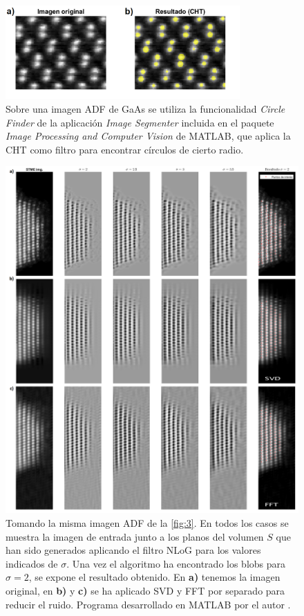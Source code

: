 \begin{figure}[h!]
    \centering
    \includegraphics[width=0.8\textwidth]{fig/Fig6.png}
    \caption{Sobre una imagen ADF de GaAs \cite{maria} se utiliza la funcionalidad \textit{Circle Finder} de la aplicación \textit{Image Segmenter} incluida en el paquete \textit{Image Processing and Computer Vision} de MATLAB, que aplica la CHT \cite{matlab_circulos} como filtro para encontrar círculos de cierto radio.}
    \label{fig:6}
\end{figure}

\newpage
\begin{figure}[h!]
    \centering
    \includegraphics[width=1\textwidth]{fig/Fig7.png}
    \caption{Tomando la misma imagen ADF de la \autoref{fig:3}. En todos los casos se muestra la imagen de entrada junto a los planos del volumen $S$ que han sido generados aplicando el filtro NLoG para los valores indicados de $\sigma$. Una vez el algoritmo ha encontrado los blobs para $\sigma = 2$, se expone el resultado obtenido. En \textbf{a)} tenemos la imagen original, en \textbf{b)} y \textbf{c)} se ha aplicado SVD y FFT por separado para reducir el ruido. Programa desarrollado en MATLAB por el autor \cite{repo}.}
    \label{fig:7}
\end{figure}

